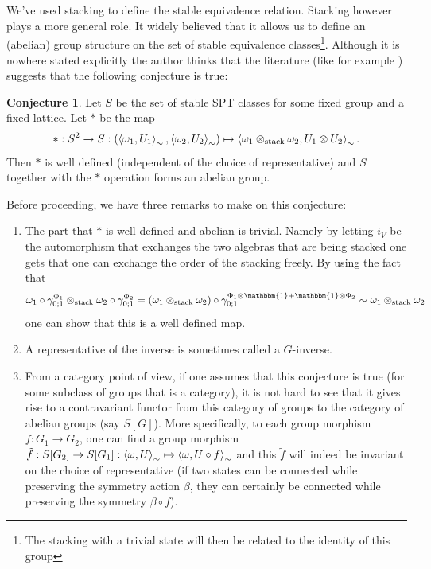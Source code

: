 \documentclass[12pt,a4paper,twoside]{article}
\newcommand{\id}{\mathbbm{1}}
\theoremstyle{definition}
\newtheorem{conjecture}[theorem]{Conjecture}
\numberwithin{equation}{section}
\begin{document}
\\\\
We've used stacking to define the stable equivalence relation. Stacking however plays a more general role. It widely believed that it allows us to define an (abelian) group structure on the set of stable equivalence classes\footnote{The stacking with a trivial state will then be related to the identity of this group}. Although it is nowhere stated explicitly the author thinks that the literature (like for example \cite{kapustin2021classification}) suggests that the following conjecture is true:
\begin{conjecture}\label{conj:StableEquivGroupStructure}
	Let $S$ be the set of stable SPT classes for some fixed group and a fixed lattice. Let $*$ be the map
	\begin{equation}
		*:S^2\rightarrow S:(\expval{\omega_1,U_1}_{\sim},\expval{\omega_2,U_2}_{\sim})\mapsto \expval{\omega_1\otimes_\text{stack}\omega_2,U_1\otimes U_2}_{\sim}.
	\end{equation}
	Then $*$ is well defined (independent of the choice of representative) and $S$ together with the $*$ operation forms an abelian group.
\end{conjecture}
Before proceeding, we have three remarks to make on this conjecture:
\begin{enumerate}
	\item The part that $*$ is well defined and abelian is trivial. Namely by letting $i_V$ be the automorphism that exchanges the two algebras that are being stacked one gets that one can exchange the order of the stacking freely. By using the fact that
	\begin{equation}
		\omega_1\circ\gamma^{\Phi_1}_{0;1}\otimes_\text{stack}\omega_2\circ\gamma^{\Phi_2}_{0;1}=(\omega_1\otimes_{\text{stack}}\omega_2)\circ\gamma^{\Phi_1\otimes\id+\id\otimes\Phi_2}_{0;1}\sim\omega_1\otimes_{\text{stack}}\omega_2
	\end{equation}
	one can show that this is a well defined map.
	\item A representative of the inverse is sometimes called a $G$-inverse.
	\item From a category point of view, if one assumes that this conjecture is true (for some subclass of groups that is a category), it is not hard to see that it gives rise to a contravariant functor from this category of groups to the category of abelian groups (say $S[G]$). More specifically, to each group morphism $f:G_1\rightarrow G_2$, one can find a group morphism $\tilde{f}:S[G_2]\rightarrow S[G_1]:\expval{\omega,U}_\sim\mapsto \expval{\omega,U\circ f}_\sim$ and this $\tilde{f}$ will indeed be invariant on the choice of representative (if two states can be connected while preserving the symmetry action $\beta$, they can certainly be connected while preserving the symmetry $\beta\circ f$).
\end{enumerate}
\end{document}
